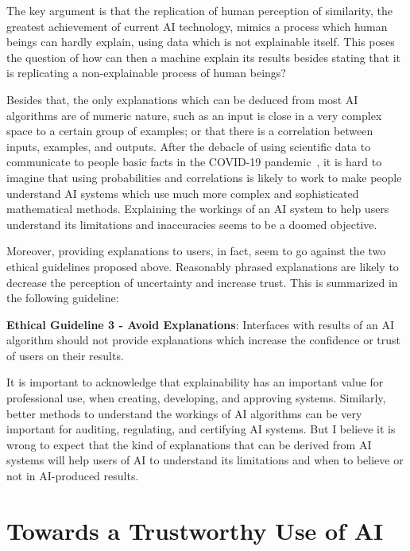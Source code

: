 \documentclass{article}
\begin{document}
The key argument is that the replication of human perception of similarity, the greatest achievement of current AI technology, mimics a process which human beings can hardly explain, using data which is not explainable itself. This poses the question of how can then a machine explain its results besides stating that it is replicating a non-explainable process of human beings? 

Besides that, the only explanations which can be deduced from most AI algorithms are of numeric nature, such as an input is close in a very complex space to a certain group of examples; or that there is a correlation between inputs, examples, and outputs. After the debacle of using scientific data to communicate to people basic facts in the COVID-19 pandemic~\cite{pennycook2020fighting}, it is hard to imagine that using probabilities and correlations is likely to work to make people understand AI systems which use much more complex and sophisticated mathematical methods. Explaining the workings of an AI system to help users understand its limitations and inaccuracies seems to be a doomed objective.

Moreover, providing explanations to users, in fact, seem to go against the two ethical guidelines proposed above. Reasonably phrased explanations are likely to decrease the perception of uncertainty and increase trust. This is summarized in the following guideline:

\noindent \textbf{Ethical Guideline 3 - Avoid Explanations}: Interfaces with results of an AI algorithm should not provide explanations which increase the confidence or trust of users on their results.

It is important to acknowledge that explainability has an important value for professional use, when creating, developing, and approving systems. Similarly, better methods to understand the workings of AI algorithms can be very important for auditing, regulating, and certifying AI systems. But I believe it is wrong to expect that the kind of explanations that can be derived from AI systems will help users of AI to understand its limitations and when to believe or not in AI-produced results. 

\section{Towards a Trustworthy Use of AI}
\end{document}
